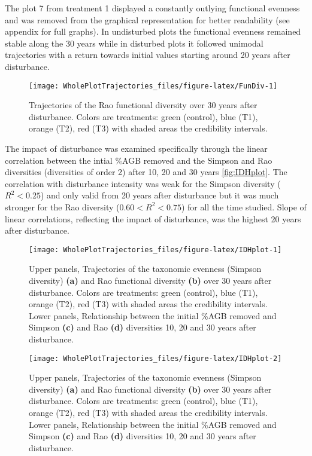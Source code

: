 \documentclass[fleqn,10pt]{ArtEcoFoG} %
\theoremstyle{definition}
\theoremstyle{definition}
\theoremstyle{definition}
\theoremstyle{remark}
\begin{document}
The plot 7 from treatment 1 displayed a constantly outlying functional
evenness and was removed from the graphical representation for better
readability (see appendix for full graphs). In undisturbed plots the
functional evenness remained stable along the 30 years while in
disturbed plots it followed unimodal trajectories with a return towards
initial values starting around 20 years after disturbance.

\begin{figure}

{\centering \texttt{[image: WholePlotTrajectories\_files/figure-latex/FunDiv-1]} 

}

\caption{Trajectories of the Rao functional diversity over 30 years after disturbance. Colors are treatments: green (control), blue (T1), orange (T2), red (T3) with shaded areas the credibility intervals.}\label{fig:FunDiv}
\end{figure}

The impact of disturbance was examined specifically through the linear
correlation between the intial \%AGB removed and the Simpson and Rao
diversities (diversities of order 2) after 10, 20 and 30 years
\ref{fig:IDHplot}. The correlation with disturbance intensity was weak
for the Simpson diversity (\(R^2<0.25\)) and only valid from 20 years
after disturbance but it was much stronger for the Rao diversity
(\(0.60<R^2<0.75\)) for all the time studied. Slope of linear
correlations, reflecting the impact of disturbance, was the highest 20
years after disturbance.

\begin{figure*}

{\centering \texttt{[image: WholePlotTrajectories\_files/figure-latex/IDHplot-1]} 

}

\caption{Upper panels, Trajectories of the taxonomic evenness (Simpson diversity) \textbf{(a)} and Rao functional diversity \textbf{(b)} over 30 years after disturbance. Colors are treatments: green (control), blue (T1), orange (T2), red (T3) with shaded areas the credibility intervals. Lower panels, Relationship between the initial \%AGB removed and Simpson \textbf{(c)} and Rao \textbf{(d)} diversities 10, 20 and 30 years after disturbance.}\label{fig:IDHplot1}
\end{figure*}\begin{figure*}

{\centering \texttt{[image: WholePlotTrajectories\_files/figure-latex/IDHplot-2]} 

}

\caption{Upper panels, Trajectories of the taxonomic evenness (Simpson diversity) \textbf{(a)} and Rao functional diversity \textbf{(b)} over 30 years after disturbance. Colors are treatments: green (control), blue (T1), orange (T2), red (T3) with shaded areas the credibility intervals. Lower panels, Relationship between the initial \%AGB removed and Simpson \textbf{(c)} and Rao \textbf{(d)} diversities 10, 20 and 30 years after disturbance.}\label{fig:IDHplot2}
\end{figure*}
\end{document}
